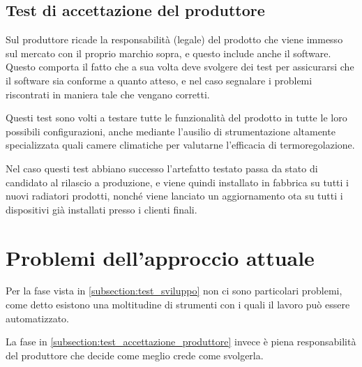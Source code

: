 \documentclass[12pt,a4paper,twoside,titlepage]{book}
\begin{document}
\subsection{Test di accettazione del produttore}
\label{subsection:test_accettazione_produttore}

Sul \gls{produttore} ricade la responsabilità (legale) del prodotto
che viene immesso sul mercato con il proprio marchio sopra, e questo include anche
il software. Questo comporta il fatto che a sua volta deve svolgere dei test per
assicurarsi che il software sia conforme a quanto atteso, e nel caso segnalare i
problemi riscontrati in maniera tale che vengano corretti.

Questi test sono volti a testare tutte le funzionalità del prodotto in tutte le loro
possibili configurazioni, anche mediante l'ausilio di strumentazione altamente
specializzata quali camere climatiche per valutarne l'efficacia di termoregolazione.

Nel caso questi test abbiano successo l'artefatto testato passa da stato di candidato
al rilascio a produzione, e viene quindi installato in fabbrica su tutti i nuovi radiatori
prodotti, nonché viene lanciato un aggiornamento \acrshort{ota} su tutti i dispositivi già installati
presso i clienti finali.

\section{Problemi dell'approccio attuale}

Per la fase vista in \autoref{subsection:test_sviluppo} non ci sono particolari problemi,
come detto esistono una moltitudine di strumenti con i quali il lavoro può essere automatizzato. 

La fase in \autoref{subsection:test_accettazione_produttore} invece è piena responsabilità del 
\gls{produttore} che decide come meglio crede come svolgerla. 
\end{document}
